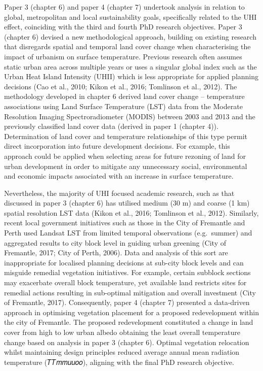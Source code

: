 \documentclass[]{book}
\begin{document}
Paper 3 (chapter 6) and paper 4 (chapter 7) undertook analysis in
relation to global, metropolitan and local sustainability goals,
specifically related to the UHI effect, coinciding with the third and
fourth PhD research objectives. Paper 3 (chapter 6) devised a new
methodological approach, building on existing research that disregards
spatial and temporal land cover change when characterising the impact of
urbanism on surface temperature. Previous research often assumes static
urban area across multiple years or uses a singular global index such as
the Urban Heat Island Intensity (UHII) which is less appropriate for
applied planning decisions (Cao et al., 2010; Kikon et al., 2016;
Tomlinson et al., 2012). The methodology developed in chapter 6 derived
land cover change -- temperature associations using Land Surface
Temperature (LST) data from the Moderate Resolution Imaging
Spectroradiometer (MODIS) between 2003 and 2013 and the previously
classified land cover data (derived in paper 1 (chapter 4)).
Determination of land cover and temperature relationships of this type
permit direct incorporation into future development decisions. For
example, this approach could be applied when selecting areas for future
rezoning of land for urban development in order to mitigate any
unnecessary social, environmental and economic impacts associated with
an increase in surface temperature.

Nevertheless, the majority of UHI focused academic research, such as
that discussed in paper 3 (chapter 6) has utilised medium (30 m) and
coarse (1 km) spatial resolution LST data (Kikon et al., 2016; Tomlinson
et al., 2012). Similarly, recent local government initiatives such as
those in the City of Fremantle and Perth used Landsat LST from limited
temporal observations (e.g.~summer) and aggregated results to city block
level in guiding urban greening (City of Fremantle, 2017; City of Perth,
2006). Data and analysis of this sort are inappropriate for localised
planning decisions at sub-city block levels and can misguide remedial
vegetation initiatives. For example, certain subblock sections may
exacerbate overall block temperature, yet available land restricts sites
for remedial actions resulting in sub-optimal mitigation and overall
investment (City of Fremantle, 2017). Consequently, paper 4 (chapter 7)
presented a data-driven approach in optimising vegetation placement for
a proposed redevelopment within the city of Fremantle. The proposed
redevelopment constituted a change in land cover from high to low urban
albedo obtaining the least overall temperature change based on analysis
in paper 3 (chapter 6). Optimal vegetation relocation whilst maintaining
design principles reduced average annual mean radiation temperature
(𝑇𝑇𝑚𝑚𝑢𝑢𝑜𝑜), aligning with the final PhD research objective.
\end{document}
